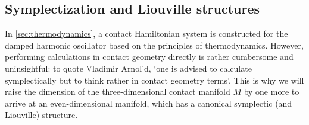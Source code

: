 %
%


\subsection{Symplectization and Liouville structures}
\label{ssec:symplectization}
In \cref{sec:thermodynamics}, a contact Hamiltonian system is constructed for the damped harmonic oscillator based on the principles of thermodynamics. However, performing calculations in contact geometry directly is rather cumbersome and uninsightful: to quote Vladimir Arnol'd, `one is advised to calculate symplectically but to think rather in contact geometry terms'. \cite{VanderSchaft2021a,Arnold1989a} This is why we will raise the dimension of the three-dimensional contact manifold $M$ by one more to arrive at an even-dimensional manifold, which has a canonical symplectic (and Liouville) structure.

